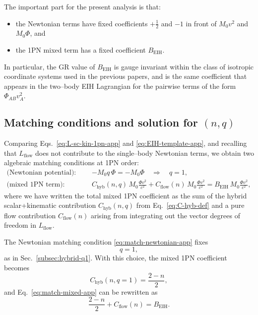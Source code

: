 \documentclass[11pt]{article}
\begin{document}
The important part for the present analysis is that:
\begin{itemize}
  \item the Newtonian terms have fixed coefficients \(+\tfrac{1}{2}\) and
        \(-1\) in front of \(M_0 v^2\) and \(M_0 \Phi\), and
  \item the 1PN mixed term has a fixed coefficient \(B_{\text{EIH}}\).
\end{itemize}
In particular, the GR value of \(B_{\text{EIH}}\) is gauge invariant within
the class of isotropic coordinate systems used in the previous papers, and
is the same coefficient that appears in the two--body EIH Lagrangian for the
pairwise terms of the form \(\Phi_{AB} v_A^2\).

\subsection{Matching conditions and solution for \texorpdfstring{$(n,q)$}{(n,q)}}
\label{app:1pn-matching}

Comparing Eqs.~\eqref{eq:L-sc-kin-1pn-app} and
\eqref{eq:EIH-template-app}, and recalling that \(L_{\text{flow}}\) does
not contribute to the single--body Newtonian terms, we obtain two algebraic
matching conditions at 1PN order:
\begin{align}
  \text{(Newtonian potential)}:
  \qquad & -M_0 q\,\Phi
           = -M_0 \Phi
           \quad\Rightarrow\quad
           q = 1,
  \label{eq:match-newtonian-app} \\
  \text{(mixed 1PN term)}:
  \qquad & C_{\text{hyb}}(n,q)\,M_0 \frac{\Phi v^2}{c^2}
            + C_{\text{flow}}(n)\,M_0 \frac{\Phi v^2}{c^2}
            = B_{\text{EIH}}\,M_0 \frac{\Phi v^2}{c^2},
  \label{eq:match-mixed-app}
\end{align}
where we have written the total mixed 1PN coefficient as the sum of the
hybrid scalar+kinematic contribution \(C_{\text{hyb}}(n,q)\) from
Eq.~\eqref{eq:C-hyb-def} and a pure flow contribution
\(C_{\text{flow}}(n)\) arising from integrating out the vector degrees of
freedom in \(L_{\text{flow}}\).

The Newtonian matching condition \eqref{eq:match-newtonian-app} fixes
\begin{equation}
  q = 1,
\end{equation}
as in Sec.~\ref{subsec:hybrid-q1}.  With this choice, the mixed 1PN
coefficient becomes
\begin{equation}
  C_{\text{hyb}}(n,q=1)
  = \frac{2 - n}{2},
\end{equation}
and Eq.~\eqref{eq:match-mixed-app} can be rewritten as
\begin{equation}
  \frac{2 - n}{2} + C_{\text{flow}}(n) = B_{\text{EIH}}.
  \label{eq:matching-eq-n}
\end{equation}
\end{document}
